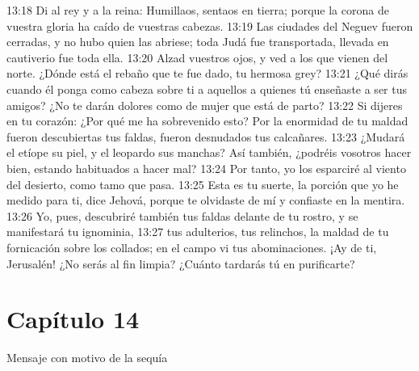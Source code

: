 13:18 Di al rey y a la reina: Humillaos, sentaos en tierra; porque la corona de vuestra gloria ha caído de vuestras cabezas. 
13:19 Las ciudades del Neguev fueron cerradas, y no hubo quien las abriese; toda Judá fue transportada, llevada en cautiverio fue toda ella. 
13:20 Alzad vuestros ojos, y ved a los que vienen del norte. ¿Dónde está el rebaño que te fue dado, tu hermosa grey? 
13:21 ¿Qué dirás cuando él ponga como cabeza sobre ti a aquellos a quienes tú enseñaste a ser tus amigos? ¿No te darán dolores como de mujer que está de parto? 
13:22 Si dijeres en tu corazón: ¿Por qué me ha sobrevenido esto? Por la enormidad de tu maldad fueron descubiertas tus faldas, fueron desnudados tus calcañares. 
13:23 ¿Mudará el etíope su piel, y el leopardo sus manchas? Así también, ¿podréis vosotros hacer bien, estando habituados a hacer mal? 
13:24 Por tanto, yo los esparciré al viento del desierto, como tamo que pasa. 
13:25 Esta es tu suerte, la porción que yo he medido para ti, dice Jehová, porque te olvidaste de mí y confiaste en la mentira. 
13:26 Yo, pues, descubriré también tus faldas delante de tu rostro, y se manifestará tu ignominia, 
13:27 tus adulterios, tus relinchos, la maldad de tu fornicación sobre los collados; en el campo vi tus abominaciones. ¡Ay de ti, Jerusalén! ¿No serás al fin limpia? ¿Cuánto tardarás tú en purificarte? 
\section*{Capítulo 14 }
Mensaje con motivo de la sequía 
 
